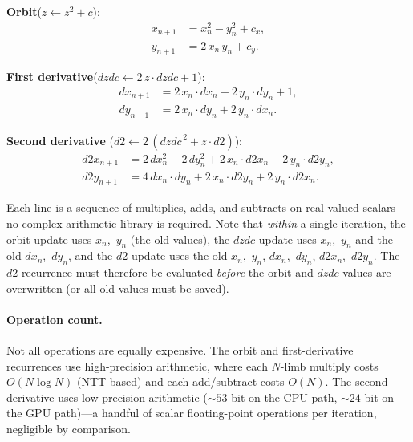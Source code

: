 \medskip\noindent
\textbf{Orbit}\quad ($z \leftarrow z^2 + c$):
\begin{equation}\label{eq:ff-orbit-ri}
\boxed{\begin{aligned}
x_{n+1} &= x_n^2 - y_n^2 + c_x, \\
y_{n+1} &= 2\,x_n\,y_n + c_y.
\end{aligned}}
\end{equation}

\noindent
\textbf{First derivative}\quad ($\mathit{dzdc} \leftarrow 2\,z\cdot\mathit{dzdc} + 1$):
\begin{equation}\label{eq:ff-dzdc-ri}
\boxed{\begin{aligned}
dx_{n+1} &= 2\,x_n \cdot dx_n - 2\,y_n \cdot dy_n + 1, \\
dy_{n+1} &= 2\,x_n \cdot dy_n + 2\,y_n \cdot dx_n.
\end{aligned}}
\end{equation}

\noindent
\textbf{Second derivative}\quad
($d2 \leftarrow 2\,(\mathit{dzdc}^{\,2} + z \cdot d2)$):
\begin{equation}\label{eq:ff-d2-ri}
\boxed{\begin{aligned}
d2x_{n+1} &= 2\,dx_n^2 - 2\,dy_n^2
              + 2\,x_n \cdot d2x_n - 2\,y_n \cdot d2y_n, \\
d2y_{n+1} &= 4\,dx_n \cdot dy_n
              + 2\,x_n \cdot d2y_n + 2\,y_n \cdot d2x_n.
\end{aligned}}
\end{equation}

\noindent
Each line is a sequence of multiplies, adds, and subtracts on real-valued
scalars---no complex arithmetic library is required.  Note that
\emph{within} a single iteration, the orbit update uses $x_n$,~$y_n$ (the
old values), the $\mathit{dzdc}$ update uses $x_n$,~$y_n$ and the old
$dx_n$,~$dy_n$, and the $d2$ update uses the old $x_n$,~$y_n$,
$dx_n$,~$dy_n$, $d2x_n$,~$d2y_n$.  The $d2$ recurrence must therefore be
evaluated \emph{before} the orbit and $\mathit{dzdc}$ values are
overwritten (or all old values must be saved).

\paragraph{Operation count.}
Not all operations are equally expensive.  The orbit and first-derivative
recurrences use high-precision  arithmetic, where each
$N$-limb multiply costs $O(N \log N)$ (NTT-based) and each add/subtract
costs $O(N)$.  The second derivative uses low-precision
 arithmetic (${\sim}53$-bit on the CPU path,
${\sim}24$-bit on the GPU path)---a handful of scalar floating-point
operations per iteration, negligible by comparison.

